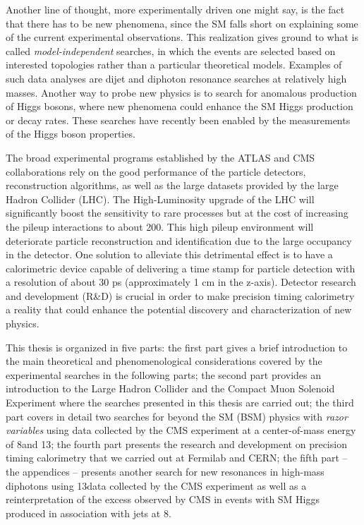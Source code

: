 Another line of thought, more experimentally driven one might say, is
the fact that there has to be new phenomena, since the SM falls short
on explaining some of the current experimental observations. This realization gives
ground to what is called \textit{model-independent} searches, in which
the events are selected based on interested topologies rather than a
particular theoretical models. Examples of such data analyses are dijet and
diphoton resonance searches at relatively high masses. Another way to
probe new physics is to search for anomalous production of Higgs
bosons, where new phenomena could enhance the SM Higgs production or
decay rates. These searches have recently been enabled by the
measurements of the Higgs boson properties.

The broad experimental programs established by the ATLAS and CMS
collaborations rely on the good performance of the particle detectors,
reconstruction algorithms, as well as the large datasets provided by
the large Hadron Collider (LHC). The High-Luminosity upgrade of the
LHC will significantly boost the sensitivity to rare processes but at
the cost of increasing the pileup interactions to about 200. This high
pileup environment will deteriorate particle reconstruction and
identification due to the large occupancy in the detector. One
solution to alleviate this detrimental effect is to have a
calorimetric device capable of delivering a time stamp for particle
detection with a resolution of about 30 ps (approximately 1 cm in the
z-axis). Detector research and  development (R\&D) is crucial in order
to make precision timing calorimetry a reality that could enhance the
potential discovery and characterization of new physics. 


This thesis is organized in five parts: the first part gives a brief
introduction to the main theoretical and phenomenological
considerations covered by the experimental searches in the following
parts; the second part provides an introduction to the Large Hadron
Collider and the Compact Muon Solenoid Experiment where the searches
presented in this thesis are carried out; the third part covers in
detail two searches for beyond the SM (BSM) physics with \textit{razor variables} using data collected by
the CMS experiment at a center-of-mass energy of 8\TeV and 13\TeV; the
fourth part presents the research and development on precision timing
calorimetry that we carried out at Fermilab and CERN; the fifth part -- the appendices
-- presents another search for new resonances in high-mass diphotons using 13\TeV data collected by the CMS experiment as well
as a reinterpretation of the excess observed by CMS in events with SM
Higgs produced in association with jets at 8\TeV.


